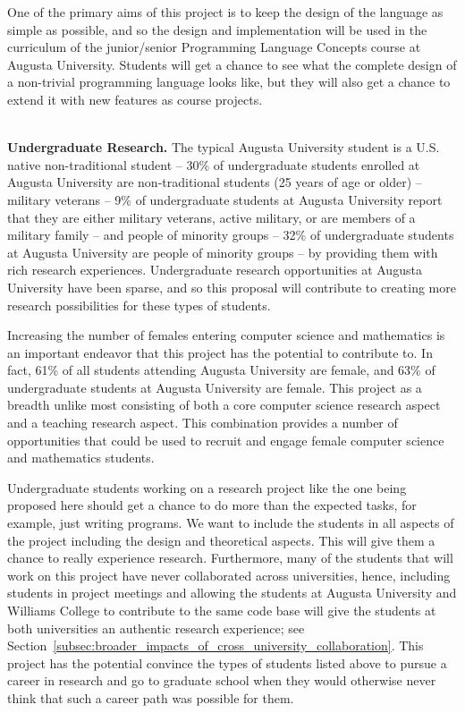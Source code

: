 One of the primary aims of this project is to keep the design of the
language as simple as possible, and so the design and implementation
will be used in the curriculum of the junior/senior Programming
Language Concepts course at Augusta University.  Students will get a
chance to see what the complete design of a non-trivial programming
language looks like, but they will also get a chance to extend it with
new features as course projects.

\ \\
\noindent
\textbf{Undergraduate Research.}  The typical Augusta University
student is a U.S. native non-traditional student -- 30\% of
undergraduate students enrolled at Augusta University are
non-traditional students (25 years of age or older) -- military
veterans -- 9\% of undergraduate students at Augusta University report
that they are either military veterans, active military, or are
members of a military family -- and people of minority groups -- 32\%
of undergraduate students at Augusta University are people of minority
groups -- by providing them with rich research
experiences. Undergraduate research opportunities at Augusta
University have been sparse, and so this proposal will contribute to
creating more research possibilities for these types of students.


Increasing the number of females entering computer science and
mathematics is an important endeavor that this project has the
potential to contribute to.  In fact, 61\% of all students attending
Augusta University are female, and 63\% of undergraduate students at
Augusta University are female.  This project as a breadth unlike most
consisting of both a core computer science research aspect and a
teaching research aspect.  This combination provides a number of
opportunities that could be used to recruit and engage female computer
science and mathematics students.

Undergraduate students working on a research project like the one
being proposed here should get a chance to do more than the expected
tasks, for example, just writing programs.  We want to include the
students in all aspects of the project including the design and
theoretical aspects.  This will give them a chance to really
experience research.  Furthermore, many of the students that will work
on this project have never collaborated across universities, hence,
including students in project meetings and allowing the students at
Augusta University and Williams College to contribute to the same code
base will give the students at both universities an authentic research
experience; see
Section~\ref{subsec:broader_impacts_of_cross_university_collaboration}. This
project has the potential convince the types of students listed above
to pursue a career in research and go to graduate school when they
would otherwise never think that such a career path was possible for
them.

